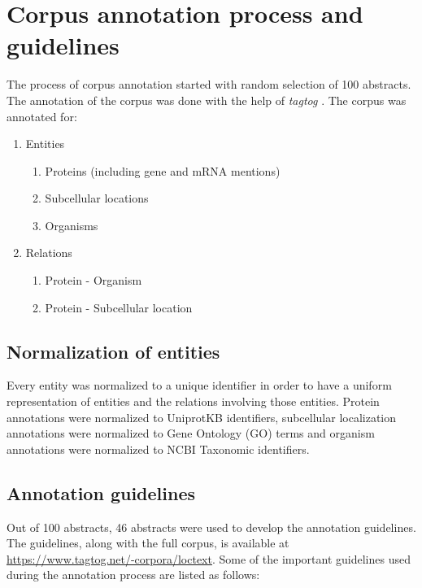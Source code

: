 \section{Corpus annotation process and guidelines}

The process of corpus annotation started with random selection of 100 abstracts. The annotation of the corpus was done with the help of \textit{tagtog} \cite{cejuela2014tagtog}. The corpus was annotated for:

\begin{enumerate}
\item Entities
\begin{enumerate}
\item Proteins (including gene and mRNA mentions)
\item Subcellular locations
\item Organisms
\end{enumerate}
\item Relations
\begin{enumerate}
\item Protein - Organism
\item Protein - Subcellular location
\end{enumerate}
\end{enumerate}

\subsection*{Normalization of entities}

Every entity was normalized to a unique identifier in order to have a uniform representation of entities and the relations involving those entities. Protein annotations were normalized to UniprotKB \cite{magrane2011uniprot} identifiers, subcellular localization annotations were normalized to Gene Ontology (GO) \cite{ashburner2000gene} terms and organism annotations were normalized to NCBI Taxonomic \cite{ncbiTaxonomy} identifiers.

\subsection*{Annotation guidelines}
Out of 100 abstracts, 46 abstracts were used to develop the annotation guidelines. The guidelines, along with the full corpus, is available at \url{https://www.tagtog.net/-corpora/loctext}. Some of the important guidelines used during the annotation process are listed as follows:

